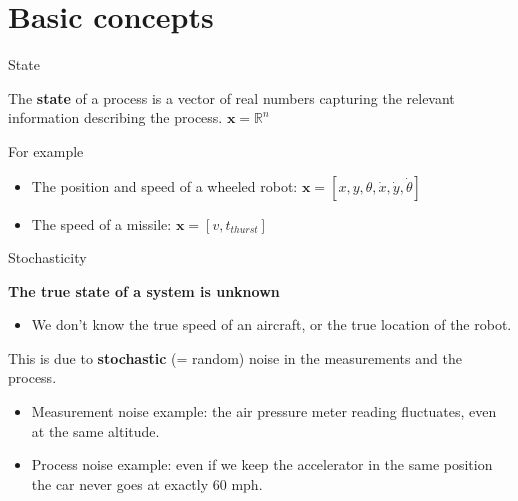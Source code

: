 \documentclass[compress]{beamer}
\begin{document}
\section{Basic concepts}

\begin{frame}{State}

    The \textbf{state} of a process is a vector of real numbers capturing
    the relevant information describing the process. $\mathbf{x} = \mathbb{R}^n$

    For example

    \begin{itemize}
        \item The position and speed of a wheeled robot: $\mathbf{x}=[x, y, \theta, \dot{x}, \dot{y}, \dot{\theta}]$
        \item The speed of a missile: $\mathbf{x}=[v, t_{thurst}]$
    \end{itemize}

\end{frame}

\begin{frame}{Stochasticity}

    \textbf{The true state of a system is unknown}

    \begin{itemize}
        \item We don't know the true speed of an aircraft, or the true location
            of the robot.
    \end{itemize}

    This is due to \textbf{stochastic} (= random) noise in the measurements and the
    process.

    \begin{itemize}
        \item Measurement noise example: the air pressure meter reading fluctuates,
            even at the same altitude.
        \item Process noise example: even if we keep the accelerator in the same
            position the car never goes at exactly 60 mph.
    \end{itemize}

\end{frame}
\end{document}
